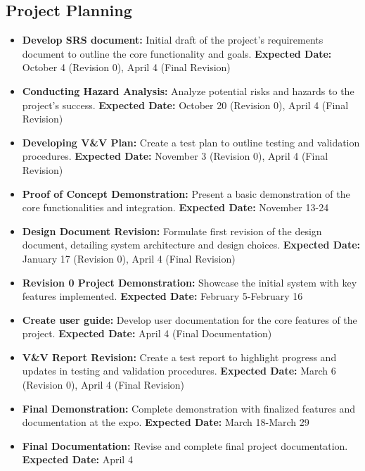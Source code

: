\documentclass[12pt]{article}
\begin{document}
\subsection{Project Planning}
\begin{itemize}
  \item \textbf{Develop SRS document:} Initial draft of the project's requirements document to outline the core functionality and goals.
  \subitem \textbf{Expected Date:} October 4 (Revision 0), April 4 (Final Revision)
  
  \item \textbf{Conducting Hazard Analysis:} Analyze potential risks and hazards to the project’s success.
  \subitem \textbf{Expected Date:} October 20 (Revision 0), April 4 (Final Revision)
  
  \item \textbf{Developing V\&V Plan:} Create a test plan to outline testing and validation procedures.
  \subitem \textbf{Expected Date:} November 3 (Revision 0), April 4 (Final Revision)
  
  \item \textbf{Proof of Concept Demonstration:} Present a basic demonstration of the core functionalities and integration.
  \subitem \textbf{Expected Date:} November 13-24
  
  \item \textbf{Design Document Revision:} Formulate first revision of the design document, detailing system architecture and design choices.
  \subitem \textbf{Expected Date:} January 17 (Revision 0), April 4 (Final Revision)
  
  \item \textbf{Revision 0 Project Demonstration:} Showcase the initial system with key features implemented.
  \subitem \textbf{Expected Date:} February 5-February 16
  
  \item \textbf{Create user guide:} Develop user documentation for the core features of the project.
  \subitem \textbf{Expected Date:} April 4 (Final Documentation)
  
  \item \textbf{V\&V Report Revision:} Create a test report to highlight progress and updates in testing and validation procedures.
  \subitem \textbf{Expected Date:} March 6 (Revision 0), April 4 (Final Revision)
  
  \item \textbf{Final Demonstration:} Complete demonstration with finalized features and documentation at the expo.
  \subitem \textbf{Expected Date:} March 18-March 29
  
  \item \textbf{Final Documentation:} Revise and complete final project documentation.
  \subitem \textbf{Expected Date:} April 4
\end{itemize}
\end{document}
